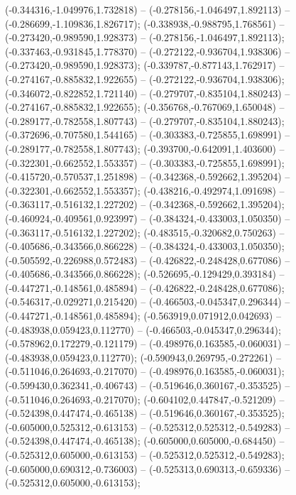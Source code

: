  (-0.344316,-1.049976,1.732818) -- (-0.278156,-1.046497,1.892113) -- (-0.286699,-1.109836,1.826717);
 (-0.338938,-0.988795,1.768561) -- (-0.273420,-0.989590,1.928373) -- (-0.278156,-1.046497,1.892113);
 (-0.337463,-0.931845,1.778370) -- (-0.272122,-0.936704,1.938306) -- (-0.273420,-0.989590,1.928373);
 (-0.339787,-0.877143,1.762917) -- (-0.274167,-0.885832,1.922655) -- (-0.272122,-0.936704,1.938306);
 (-0.346072,-0.822852,1.721140) -- (-0.279707,-0.835104,1.880243) -- (-0.274167,-0.885832,1.922655);
 (-0.356768,-0.767069,1.650048) -- (-0.289177,-0.782558,1.807743) -- (-0.279707,-0.835104,1.880243);
 (-0.372696,-0.707580,1.544165) -- (-0.303383,-0.725855,1.698991) -- (-0.289177,-0.782558,1.807743);
 (-0.393700,-0.642091,1.403600) -- (-0.322301,-0.662552,1.553357) -- (-0.303383,-0.725855,1.698991);
 (-0.415720,-0.570537,1.251898) -- (-0.342368,-0.592662,1.395204) -- (-0.322301,-0.662552,1.553357);
 (-0.438216,-0.492974,1.091698) -- (-0.363117,-0.516132,1.227202) -- (-0.342368,-0.592662,1.395204);
 (-0.460924,-0.409561,0.923997) -- (-0.384324,-0.433003,1.050350) -- (-0.363117,-0.516132,1.227202);
 (-0.483515,-0.320682,0.750263) -- (-0.405686,-0.343566,0.866228) -- (-0.384324,-0.433003,1.050350);
 (-0.505592,-0.226988,0.572483) -- (-0.426822,-0.248428,0.677086) -- (-0.405686,-0.343566,0.866228);
 (-0.526695,-0.129429,0.393184) -- (-0.447271,-0.148561,0.485894) -- (-0.426822,-0.248428,0.677086);
 (-0.546317,-0.029271,0.215420) -- (-0.466503,-0.045347,0.296344) -- (-0.447271,-0.148561,0.485894);
 (-0.563919,0.071912,0.042693) -- (-0.483938,0.059423,0.112770) -- (-0.466503,-0.045347,0.296344);
 (-0.578962,0.172279,-0.121179) -- (-0.498976,0.163585,-0.060031) -- (-0.483938,0.059423,0.112770);
 (-0.590943,0.269795,-0.272261) -- (-0.511046,0.264693,-0.217070) -- (-0.498976,0.163585,-0.060031);
 (-0.599430,0.362341,-0.406743) -- (-0.519646,0.360167,-0.353525) -- (-0.511046,0.264693,-0.217070);
 (-0.604102,0.447847,-0.521209) -- (-0.524398,0.447474,-0.465138) -- (-0.519646,0.360167,-0.353525);
 (-0.605000,0.525312,-0.613153) -- (-0.525312,0.525312,-0.549283) -- (-0.524398,0.447474,-0.465138);
 (-0.605000,0.605000,-0.684450) -- (-0.525312,0.605000,-0.613153) -- (-0.525312,0.525312,-0.549283);
 (-0.605000,0.690312,-0.736003) -- (-0.525313,0.690313,-0.659336) -- (-0.525312,0.605000,-0.613153);
